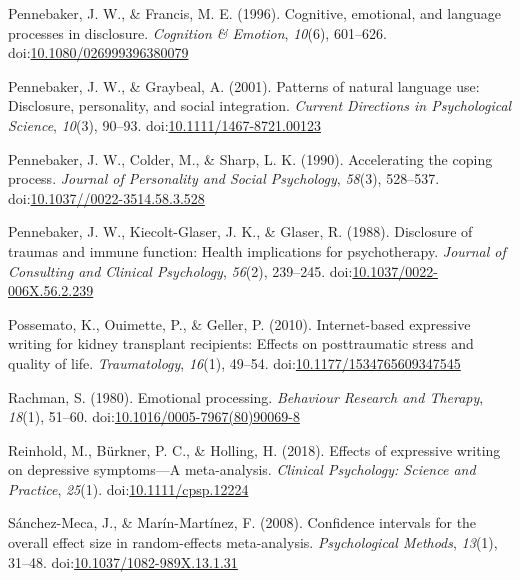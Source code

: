 \documentclass[man, mask]{apa6}
\theoremstyle{definition}
\theoremstyle{definition}
\theoremstyle{definition}
\theoremstyle{remark}
\begin{document}
\hypertarget{ref-Pennebaker1996}{}
Pennebaker, J. W., \& Francis, M. E. (1996). Cognitive, emotional, and
language processes in disclosure. \emph{Cognition \& Emotion},
\emph{10}(6), 601--626.
doi:\href{https://doi.org/10.1080/026999396380079}{10.1080/026999396380079}

\hypertarget{ref-Pennebaker2001}{}
Pennebaker, J. W., \& Graybeal, A. (2001). Patterns of natural language
use: Disclosure, personality, and social integration. \emph{Current
Directions in Psychological Science}, \emph{10}(3), 90--93.
doi:\href{https://doi.org/10.1111/1467-8721.00123}{10.1111/1467-8721.00123}

\hypertarget{ref-Pennebaker1990}{}
Pennebaker, J. W., Colder, M., \& Sharp, L. K. (1990). Accelerating the
coping process. \emph{Journal of Personality and Social Psychology},
\emph{58}(3), 528--537.
doi:\href{https://doi.org/10.1037//0022-3514.58.3.528}{10.1037//0022-3514.58.3.528}

\hypertarget{ref-Pennebaker1988}{}
Pennebaker, J. W., Kiecolt-Glaser, J. K., \& Glaser, R. (1988).
Disclosure of traumas and immune function: Health implications for
psychotherapy. \emph{Journal of Consulting and Clinical Psychology},
\emph{56}(2), 239--245.
doi:\href{https://doi.org/10.1037/0022-006X.56.2.239}{10.1037/0022-006X.56.2.239}

\hypertarget{ref-Possemato2010}{}
Possemato, K., Ouimette, P., \& Geller, P. (2010). Internet-based
expressive writing for kidney transplant recipients: Effects on
posttraumatic stress and quality of life. \emph{Traumatology},
\emph{16}(1), 49--54.
doi:\href{https://doi.org/10.1177/1534765609347545}{10.1177/1534765609347545}

\hypertarget{ref-Rachman1980}{}
Rachman, S. (1980). Emotional processing. \emph{Behaviour Research and
Therapy}, \emph{18}(1), 51--60.
doi:\href{https://doi.org/10.1016/0005-7967(80)90069-8}{10.1016/0005-7967(80)90069-8}

\hypertarget{ref-Reinhold2018}{}
Reinhold, M., Bürkner, P. C., \& Holling, H. (2018). Effects of
expressive writing on depressive symptoms---A meta-analysis.
\emph{Clinical Psychology: Science and Practice}, \emph{25}(1).
doi:\href{https://doi.org/10.1111/cpsp.12224}{10.1111/cpsp.12224}

\hypertarget{ref-Sanchez-Meca2008a}{}
Sánchez-Meca, J., \& Marín-Martínez, F. (2008). Confidence intervals for
the overall effect size in random-effects meta-analysis.
\emph{Psychological Methods}, \emph{13}(1), 31--48.
doi:\href{https://doi.org/10.1037/1082-989X.13.1.31}{10.1037/1082-989X.13.1.31}
\end{document}
